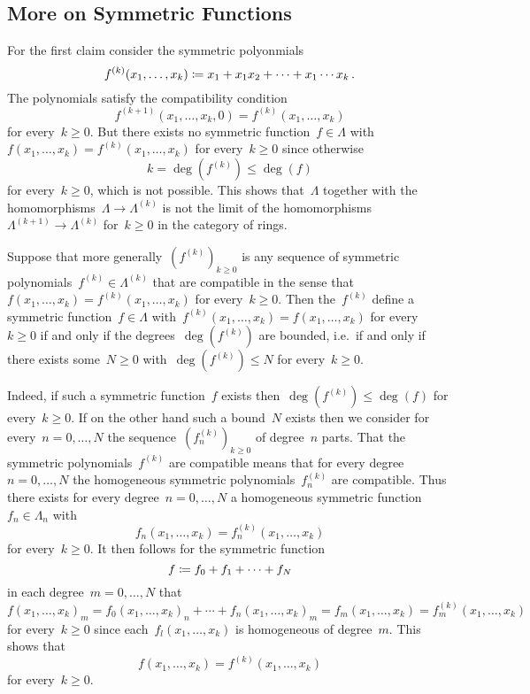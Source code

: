 \documentclass[a4paper,11pt]{scrartcl}
\begin{document}
\subsection{More on Symmetric Functions}
\label{wrong symmetric functions}

For the first claim consider the symmetric polyonmials
\[
  f^{ (k) }(x_1, \dotsc, x_k)
  \coloneqq
  x_1 + x_1 x_2 + \dotsb + x_1 \dotsm x_k \,.
\]
The polynomials satisfy the compatibility condition
\[
  f^{(k+1)}(x_1, \dotsc, x_k, 0) = f^{(k)}(x_1, \dotsc, x_k)
\]
for every~$k \geq 0$.
But there exists no symmetric function~$f \in \Lambda$ with~$f(x_1, \dotsc, x_k) = f^{(k)}(x_1, \dotsc, x_k)$ for every~$k \geq 0$ since otherwise
\[
  k
  =
  \deg(f^{(k)})
  \leq
  \deg(f)
\]
for every~$k \geq 0$, which is not possible.
This shows that~$\Lambda$ together with the homomorphisms~$\Lambda \to \Lambda^{(k)}$ is not the limit of the homomorphisms~$\Lambda^{(k+1)} \to \Lambda^{(k)}$ for~$k \geq 0$ in the category of rings.

Suppose that more generally~$( f^{(k)} )_{k \geq 0}$ is any sequence of symmetric polynomials~$f^{(k)} \in \Lambda^{(k)}$ that are compatible in the sense that~$f(x_1, \dotsc, x_k) = f^{(k)}(x_1, \dotsc, x_k)$ for every~$k \geq 0$.
Then the~$f^{(k)}$ define a symmetric function~$f \in \Lambda$ with~$f^{(k)}(x_1, \dotsc, x_k) = f(x_1, \dotsc, x_k)$ for every~$k \geq 0$ if and only if the degrees~$\deg( f^{(k)} )$ are bounded, i.e.\ if and only if there exists some~$N \geq 0$ with~$\deg( f^{(k)} ) \leq N$ for every~$k \geq 0$.

Indeed, if such a symmetric function~$f$ exists then~$\deg( f^{(k)} ) \leq \deg(f)$ for every~$k \geq 0$.
If on the other hand such a bound~$N$ exists then we consider for every~$n = 0, \dotsc, N$ the sequence~$( f^{(k)}_n )_{k \geq 0}$ of degree~$n$ parts.
That the symmetric polynomials~$f^{(k)}$ are compatible means that for every degree~$n = 0, \dotsc, N$ the homogeneous symmetric polynomials~$f^{(k)}_n$ are compatible.
Thus there exists for every degree~$n = 0, \dotsc, N$ a homogeneous symmetric function~$f_n \in \Lambda_n$ with
\[
  f_n(x_1, \dots, x_k)
  =
  f^{(k)}_n(x_1, \dotsc, x_k)
\]
for every~$k \geq 0$.
It then follows for the symmetric function
\[
  f
  \coloneqq
  f_0 + f_1 + \dotsb + f_N
\]
in each degree~$m = 0, \dotsc, N$ that
\[
  f(x_1, \dotsc, x_k)_m
  =
  f_0(x_1, \dotsc, x_k)_n
  +
  \dotsb
  +
  f_n(x_1, \dotsc, x_k)_m
  =
  f_m(x_1, \dotsc, x_k)
  =
  f^{(k)}_m(x_1, \dotsc, x_k)
\]
for every~$k \geq 0$ since each~$f_l(x_1, \dotsc, x_k)$ is homogeneous of degree~$m$.
This shows that
\[
  f(x_1, \dotsc, x_k) = f^{(k)}(x_1, \dotsc, x_k)
\]
for every~$k \geq 0$.
\end{document}
